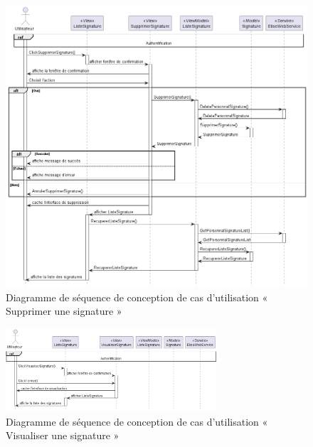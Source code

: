 \begin{figure}[H]
  \centering
  \includegraphics[width=1\textwidth]{out/diagrams/signatures/sequence_delete/sequence_delete_signature}
  \caption{Diagramme de séquence de conception de cas d'utilisation « Supprimer une signature  »}
  \label{fig:sequence_conception_delete_signature}
\end{figure}

\begin{figure}[H]
  \centering
  \includegraphics[width=0.7\textwidth]{out/diagrams/signatures/sequence_view/sequence_view_signature}
  \caption{Diagramme de séquence de conception de cas d'utilisation « Visualiser une signature  »}
  \label{fig:sequence_conception_view_signature}
\end{figure}

